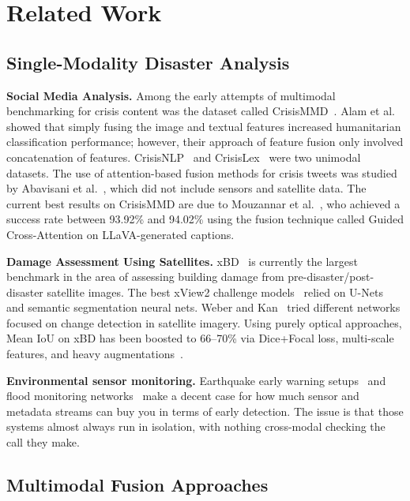 \documentclass[journal]{IEEEtran}
\begin{document}
\section{Related Work}

\subsection{Single-Modality Disaster Analysis}

\textbf{Social Media Analysis.} Among the early attempts of multimodal benchmarking for crisis content was the dataset called CrisisMMD~\cite{alam2018crisismmd}. Alam et al. showed that simply fusing the image and textual features increased humanitarian classification performance; however, their approach of feature fusion only involved concatenation of features. CrisisNLP~\cite{imran2015processing} and CrisisLex~\cite{olteanu2015crisislex} were two unimodal datasets. The use of attention-based fusion methods for crisis tweets was studied by Abavisani et al.~\cite{abavisani2020multimodal}, which did not include sensors and satellite data. The current best results on CrisisMMD are due to Mouzannar et al.~\cite{mouzannar2025guidedcross}, who achieved a success rate between 93.92\% and 94.02\% using the fusion technique called Guided Cross-Attention on LLaVA-generated captions.

\textbf{Damage Assessment Using Satellites.} xBD~\cite{gupta2019xbd} is currently the largest benchmark in the area of assessing building damage from pre-disaster/post-disaster satellite images. The best xView2 challenge models~\cite{xview2} relied on U-Nets and semantic segmentation neural nets. Weber and Kan~\cite{weber2020building} tried different networks focused on change detection in satellite imagery. Using purely optical approaches, Mean IoU on xBD has been boosted to 66--70\% via Dice+Focal loss, multi-scale features, and heavy augmentations~\cite{benson2025xbdsota}.

\textbf{Environmental sensor monitoring.} Earthquake early warning setups~\cite{allen2009real} and flood monitoring networks~\cite{basha2008model} make a decent case for how much sensor and metadata streams can buy you in terms of early detection. The issue is that those systems almost always run in isolation, with nothing cross-modal checking the call they make.

\subsection{Multimodal Fusion Approaches}
\end{document}
